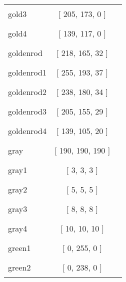 \begin{tabular}{|l|c|c|}
gold3 & [ 205, 173, 0 ] & \color{gold3} \rule{1cm}{1.5ex}\\
gold4 & [ 139, 117, 0 ] & \color{gold4} \rule{1cm}{1.5ex}\\
goldenrod & [ 218, 165, 32 ] & \color{goldenrod} \rule{1cm}{1.5ex}\\
goldenrod1 & [ 255, 193, 37 ] & \color{goldenrod1} \rule{1cm}{1.5ex}\\
goldenrod2 & [ 238, 180, 34 ] & \color{goldenrod2} \rule{1cm}{1.5ex}\\
goldenrod3 & [ 205, 155, 29 ] & \color{goldenrod3} \rule{1cm}{1.5ex}\\
goldenrod4 & [ 139, 105, 20 ] & \color{goldenrod4} \rule{1cm}{1.5ex}\\
gray & [ 190, 190, 190 ] & \color{gray} \rule{1cm}{1.5ex}\\
gray1 & [ 3, 3, 3 ] & \color{gray1} \rule{1cm}{1.5ex}\\
gray2 & [ 5, 5, 5 ] & \color{gray2} \rule{1cm}{1.5ex}\\
gray3 & [ 8, 8, 8 ] & \color{gray3} \rule{1cm}{1.5ex}\\
gray4 & [ 10, 10, 10 ] & \color{gray4} \rule{1cm}{1.5ex}\\
green1 & [ 0, 255, 0 ] & \color{green1} \rule{1cm}{1.5ex}\\
green2 & [ 0, 238, 0 ] & \color{green2} \rule{1cm}{1.5ex}\\
\end{tabular}


